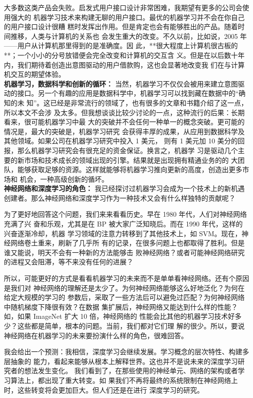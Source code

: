 大多数这类产品会失败。启发式用户接口设计非常困难，我期望有更多的公司会使用强大的
机器学习技术来构建无聊的用户接口。最优的机器学习并不会在你自己的用户接口设计很糟
糕时发挥出作用。但是肯定也会有能够胜出的产品。随着时间推移，人类与计算机的关系也
会发生重大的改变。不久以前，比如说，2005 年——用户从计算机那里得到的是准确度。因
此，**很大程度上计算机很古板的**；一个小小的分号放错便会完全改变和计算机的交互含
义。但是在以后数十年内，我们期待着创造出意图驱动的用户借款购，这也会显著地改变我
们在与计算机交互的期望体验。\\

\textbf{机器学习，数据科学和创新的循环：} 当然，机器学习不仅仅会被用来建立意图驱
动的接口。另一个有趣的应用是数据科学中，机器学习可以找到藏在数据中的“确知的未
知”。这已经是非常流行的领域了，也有很多的文章和书籍介绍了这一点，所以本文不会涉
及太多。但我想谈谈比较少讨论的一点，这种流行的后果：长期看来，很可能机器学习中最
大的突破并不会任何一种单一的概念突破。更可能的情况是，最大的突破是，机器学习研究
会获得丰厚的成果，从应用到数据科学及其他领域。如果公司在机器学习研究中投入 1 美元，
则有 1 美元加 10 美分的回报，那么机器学习研究会有很充足的资金保证。换言之，机器学
习是驱动几个主要的新市场和技术成长的领域出现的引擎。结果就是出现拥有精通业务的的
大团队，能够获取足够的资源。这样就能够将机器学习推向更新的高度，创造出更多市场和
机会，一种高级创新的循坏。\\

\textbf{神经网络和深度学习的角色：} 我已经探讨过机器学习会成为一个技术上的新机遇
创建者。那么神经网络和深度学习作为一种技术又会有什么样独特的贡献呢？

为了更好地回答这个问题，我们来来看看历史。早在 1980 年代，人们对神经网络充满了兴
奋和乐观，尤其是在 BP 被大家广泛知晓后。而在 1990 年代，这样的兴奋逐渐冷却，机器
学习领域的注意力转移到了其他技术上，如 SVM。现在，神经网络卷土重来，刷新了几乎所
有的记录，在很多问题上也都取得了胜利。但是谁又能说，明天不会有一种新的方法能够击
败神经网络？或者可能神经网络研究的进程又会阻滞，等不来没有任何的进展？

所以，可能更好的方式是看看机器学习的未来而不是单单看神经网络。还有个原因是我们对
神经网络的理解还是太少了。为何神经网络能够这么好地泛化？为何在给定大规模的学习的
参数后，采取了一些方法后可以避免过匹配？为何神经网络中随机梯度下降很有效？在数据
集扩展后，神经网络又能达到什么样的性能？如，如果 ImageNet 扩大 10 倍，神经网络的
性能会比其他的机器学习技术好多少？这些都是简单，根本的问题。当前，我们都对它们理
解的很少。所以，要说神经网络在机器学习的未来要扮演什么样的角色，很难回答。

我会给出一个预测：我相信，深度学习会继续发展。学习概念的层次特性、构建多层抽象的
能力，看起来能够从根本上解释世界。这也并不是说未来的深度学习研究者的想法发生变化。
我们看到了，在那些使用的神经单元、网络的架构或者学习算法上，都出现了重大转变。如
果我们不再将最终的系统限制在神经网络上时，这些转变将会更加巨大。但人们还是在进行
深度学习的研究。\\

